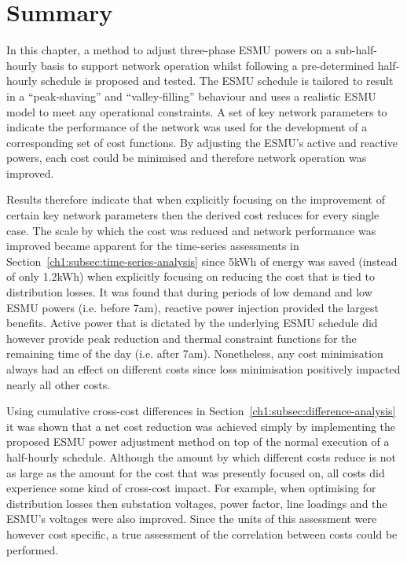 \section{Summary}
\label{ch1:sec:summary}

In this chapter, a method to adjust three-phase ESMU powers on a sub-half-hourly basis to support network operation whilst following a pre-determined half-hourly schedule is proposed and tested.
The ESMU schedule is tailored to result in a ``peak-shaving'' and ``valley-filling'' behaviour and uses a realistic ESMU model to meet any operational constraints.
A set of key network parameters to indicate the performance of the network was used for the development of a corresponding set of cost functions.
By adjusting the ESMU's active and reactive powers, each cost could be minimised and therefore network operation was improved.

Results therefore indicate that when explicitly focusing on the improvement of certain key network parameters then the derived cost reduces for every single case.
The scale by which the cost was reduced and network performance was improved became apparent for the time-series assessments in Section~\ref{ch1:subsec:time-series-analysis} since 5kWh of energy was saved (instead of only 1.2kWh) when explicitly focusing on reducing the cost that is tied to distribution losses.
It was found that during periods of low demand and low ESMU powers (i.e. before 7am), reactive power injection provided the largest benefits.
Active power that is dictated by the underlying ESMU schedule did however provide peak reduction and thermal constraint functions for the remaining time of the day (i.e. after 7am).
Nonetheless, any cost minimisation always had an effect on different costs since loss minimisation positively impacted nearly all other costs.

Using cumulative cross-cost differences in Section~\ref{ch1:subsec:difference-analysis} it was shown that a net cost reduction was achieved simply by implementing the proposed ESMU power adjustment method on top of the normal execution of a half-hourly schedule.
Although the amount by which different costs reduce is not as large as the amount for the cost that was presently focused on, all costs did experience some kind of cross-cost impact.
For example, when optimising for distribution losses then substation voltages, power factor, line loadings and the ESMU's voltages were also improved.
Since the units of this assessment were however cost specific, a true assessment of the correlation between costs could be performed.

